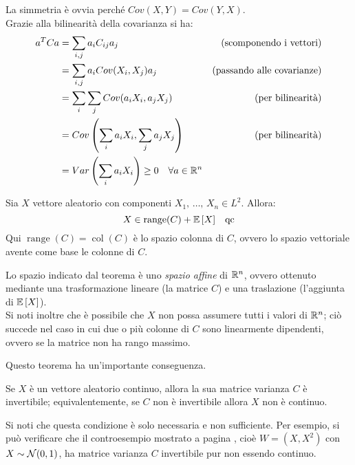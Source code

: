 \begin{dimo}\belowdisplayskip=-21pt
  La simmetria è ovvia perché $Cov(X,Y) = Cov(Y,X)$. \\
  Grazie alla bilinearità della covarianza si ha:
  \begin{align*}
    a^T C a
    &= \sum_{i,j} a_i C_{ij} a_j & (\text{scomponendo i vettori})\\
    &= \sum_{i,j} a_i Cov(X_i, X_j)  a_j & (\text{passando alle covarianze})\\
    &= \sum_i \sum_j Cov(a_i X_i, a_j X_j) & (\text{per bilinearità})\\
    &= Cov\left( \sum_i a_i X_i, \sum_j a_j X_j\right) & (\text{per bilinearità})\\
    &= Var\left(\sum_i a_i X_i\right) \geq 0 \quad \forall a \in \mathbb R^n
  \end{align*}\qedhere
\end{dimo}
\bigskip
\begin{teo} \label{appartenenza VeAle}
    Sia $X$ vettore aleatorio con componenti $X_1, \, \dots, \, X_n \in L^2$.
    Allora:
    $$X \in \operatorname{range}(C) + \mathbb E \left[ X \right] \text \enspace {\text{ qc}}$$
    Qui $\operatorname{range}(C) = \operatorname{col}(C)$ è lo spazio colonna di $C$, ovvero lo spazio vettoriale avente come base le colonne di $C$.
\end{teo}
Lo spazio indicato dal teorema è uno \textit{spazio affine} di $\mathbb R^n$, ovvero ottenuto mediante una trasformazione lineare (la matrice $C$) e una traslazione (l'aggiunta di $\mathbb E \left[ X \right]$). \\
Si noti inoltre che è possibile che $X$ non possa assumere tutti i valori di $\mathbb R^n$; ciò succede nel caso in cui due o più colonne di $C$ sono linearmente dipendenti, ovvero se la matrice non ha rango massimo.

Questo teorema ha un'importante conseguenza.
\begin{coro}
	Se $X$ è un vettore aleatorio continuo, allora la sua matrice varianza $C$ è invertibile;
	equivalentemente, se $C$ non è invertibile allora $X$ non è continuo.
\end{coro}
Si noti che questa condizione è solo necessaria e non sufficiente.
Per esempio, si può verificare che il controesempio mostrato a pagina \pageref{cese-parabola-normale}, cioè $W = (X,X^2)$ con $X \sim \mathcal N(0,1)$, ha matrice varianza $C$ invertibile pur non essendo continuo.

